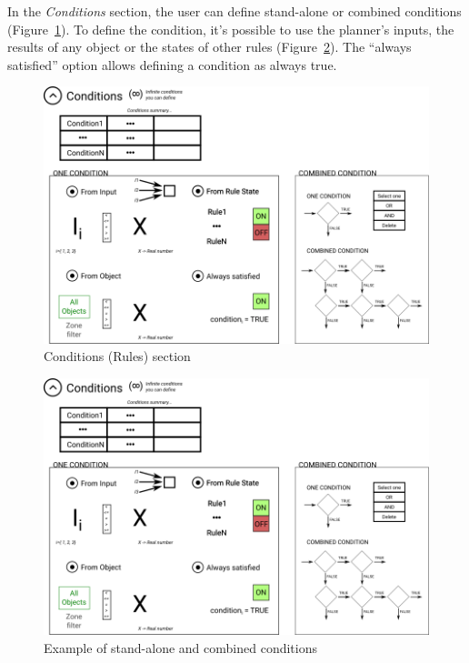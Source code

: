 \documentclass[
  letterpaper,
  DIV=11,
  numbers=noendperiod]{scrreprt}
\begin{document}
In the \emph{Conditions} section, the user can define stand-alone or
combined conditions (Figure~\ref{fig-planner_conditions_rules_section}).
To define the condition, it's possible to use the planner's inputs, the
results of any object or the states of other rules
(Figure~\ref{fig-planner_combined_conditions}). The ``always satisfied''
option allows defining a condition as always true.

\begin{figure}

{\centering \includegraphics{./figures/fig-planner_conditions_rules_section.png}

}

\caption{\label{fig-planner_conditions_rules_section}Conditions (Rules)
section}

\end{figure}

\begin{figure}

{\centering \includegraphics{./figures/fig-planner_combined_conditions.png}

}

\caption{\label{fig-planner_combined_conditions}Example of stand-alone
and combined conditions}

\end{figure}
\end{document}
